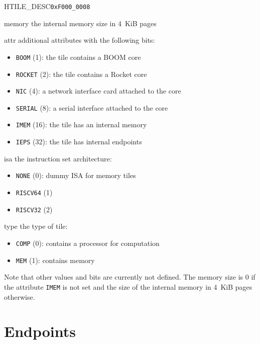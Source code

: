 \begin{register}{H}{TILE\_DESC}{\texttt{0xF000\_0008}}
  \regnewline%
  \begin{regdesc}\begin{reglist}
    \item[memory] the internal memory size in 4~KiB pages
    \item[attr] additional attributes with the following bits:
    \begin{itemize}
      \item \texttt{BOOM} (1): the tile contains a BOOM core
      \item \texttt{ROCKET} (2): the tile contains a Rocket core
      \item \texttt{NIC} (4): a network interface card attached to the core
      \item \texttt{SERIAL} (8): a serial interface attached to the core
      \item \texttt{IMEM} (16): the tile has an internal memory
      \item \texttt{IEPS} (32): the tile has internal endpoints
    \end{itemize}
    \item[isa] the instruction set architecture:
    \begin{itemize}
      \item \texttt{NONE} (0): dummy ISA for memory tiles
      \item \texttt{RISCV64} (1)
      \item \texttt{RISCV32} (2)
    \end{itemize}
    \item[type] the type of tile:
    \begin{itemize}
      \item \texttt{COMP} (0): contains a processor for computation
      \item \texttt{MEM} (1): contains memory
    \end{itemize}
  \end{reglist}\end{regdesc}
\end{register}

\noindent Note that other values and bits are currently not defined. The memory size is 0 if the
attribute \texttt{IMEM} is not set and the size of the internal memory in 4~KiB pages otherwise.

\section{Endpoints}

